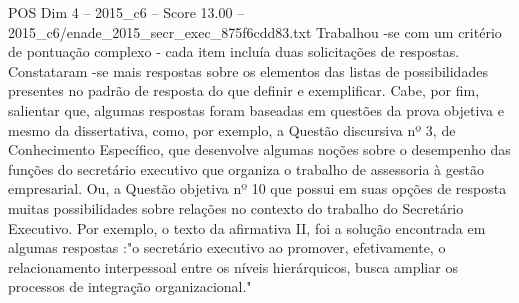 \begin{textsample}{POS Dim 4 – 2015\_c6 – Score 13.00 – 2015\_c6/enade\_2015\_secr\_exec\_875f6cdd83.txt}
Trabalhou -se com um critério de pontuação complexo - cada item incluía duas solicitações de respostas.
Constataram -se mais respostas sobre os elementos das listas de possibilidades presentes no padrão de resposta do que definir e exemplificar.
Cabe, por fim, salientar que, algumas respostas foram baseadas em questões da prova objetiva e mesmo da dissertativa, como, por exemplo, a Questão discursiva nº 3, de Conhecimento Específico, que desenvolve algumas noções sobre o desempenho das funções do secretário executivo que organiza o trabalho de assessoria à gestão empresarial.
Ou, a Questão objetiva nº 10 que possui em suas opções de resposta muitas possibilidades sobre relações no contexto do trabalho do Secretário Executivo.
Por exemplo, o texto da afirmativa II, foi a solução encontrada em algumas respostas :"o secretário executivo ao promover, efetivamente, o relacionamento interpessoal entre os níveis hierárquicos, busca ampliar os processos de integração organizacional."

\end{textsample}
